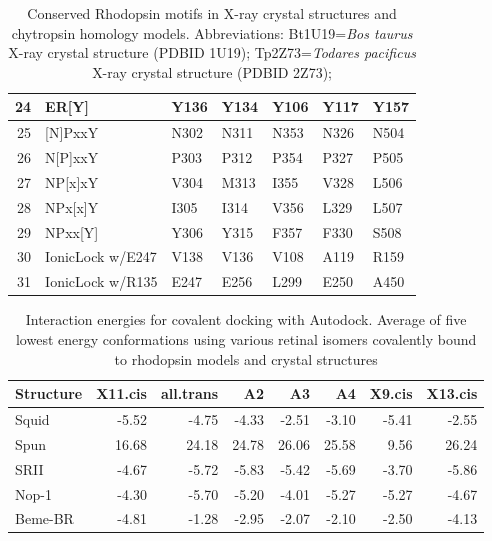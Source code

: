 \begin{table}[tbp]
\begin{tabular}{rllllll}
  24 & ER[Y] & Y136 & Y134 & Y106 & Y117 & Y157 \\ 
   \hline
25 & [N]PxxY & N302 & N311 & N353 & N326 & N504 \\ 
  26 & N[P]xxY & P303 & P312 & P354 & P327 & P505 \\ 
  27 & NP[x]xY & V304 & M313 & I355 & V328 & L506 \\ 
  28 & NPx[x]Y & I305 & I314 & V356 & L329 & L507 \\ 
  29 & NPxx[Y] & Y306 & Y315 & F357 & F330 & S508 \\ 
   \hline
30 & IonicLock w/E247 & V138 & V136 & V108 & A119 & R159 \\ 
  31 & IonicLock w/R135 & E247 & E256 & L299 & E250 & A450 \\ 
   \hline
\hline
\end{tabular}
\caption[Locations of key residues in rhodopsin structural motifs]{Conserved Rhodopsin motifs in X-ray crystal structures and chytropsin homology models. Abbreviations: Bt1U19=\textit{Bos taurus} X-ray crystal structure (PDBID 1U19); Tp2Z73=\textit{Todares pacificus} X-ray crystal structure (PDBID 2Z73);} 
\label{tab:ChRhodS_residues}
\end{table}
\begin{table}[tbp]
\centering
\begin{tabular}{lrrrrrrr}
  \hline
\hline
Structure & X11.cis & all.trans & A2 & A3 & A4 & X9.cis & X13.cis \\ 
  \hline
Squid & -5.52 & -4.75 & -4.33 & -2.51 & -3.10 & -5.41 & -2.55 \\ 
  Spun & 16.68 & 24.18 & 24.78 & 26.06 & 25.58 & 9.56 & 26.24 \\ 
  SRII & -4.67 & -5.72 & -5.83 & -5.42 & -5.69 & -3.70 & -5.86 \\ 
  Nop-1 & -4.30 & -5.70 & -5.20 & -4.01 & -5.27 & -5.27 & -4.67 \\ 
  Beme-BR & -4.81 & -1.28 & -2.95 & -2.07 & -2.10 & -2.50 & -4.13 \\ 
   \hline
\hline
\end{tabular}
\caption[Interaction energies for covalent docking]{Interaction energies for covalent docking with Autodock. Average of five lowest energy conformations using various retinal isomers covalently bound to rhodopsin models and crystal structures} 
\label{tab:ChRhodS_CovDock}
\end{table}